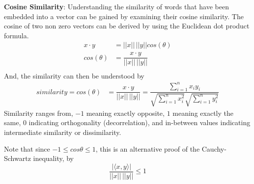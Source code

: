 \documentclass[12pt]{article}
\newenvironment{definition}[2][Definition]{\begin{trivlist}
\item[\hskip \labelsep {\bfseries #1}\hskip \labelsep {\bfseries #2}]}{\end{trivlist}}
\begin{document}
\begin{definition}{2.11.3} \textbf{Cosine Similarity}: Understanding the similarity of words that have been embedded into a vector can be gained by examining their cosine similarity. The cosine of two non zero vectors can be derived by using the Euclidean dot product formula.
\begin{equation}
\begin{split}
    x \cdot y &= ||x||\,||y||cos(\theta) \\
    cos(\theta) &= \dfrac{x \cdot y}{||x||\,||y||} \\
\end{split}
\end{equation}
\noindent
And, the similarity can then be understood by
\begin{equation}
\begin{split}
    similarity = cos(\theta) &= \dfrac{x \cdot y}{||x||\,||y||} = \dfrac{\sum^n_{i=1} x_i y_i}{\sqrt{\sum^n_{i=1} x_i^2} \sqrt{\sum^n_{i=1} y_i^2}}
\end{split}
\end{equation}
\noindent
Similarity ranges from, $-1$ meaning exactly opposite, $1$ meaning exactly the same, $0$ indicating orthogonality (decorrelation), and in-between values indicating intermediate similarity or dissimilarity.


\noindent
Note that since \(-1 \leq cos\theta \leq 1\), this is an alternative proof of the Cauchy-Schwartz inequality, by
\[\dfrac{|\langle x,y \rangle|}{||x|| \, ||y||} \leq 1\]
\end{definition}
\end{document}
